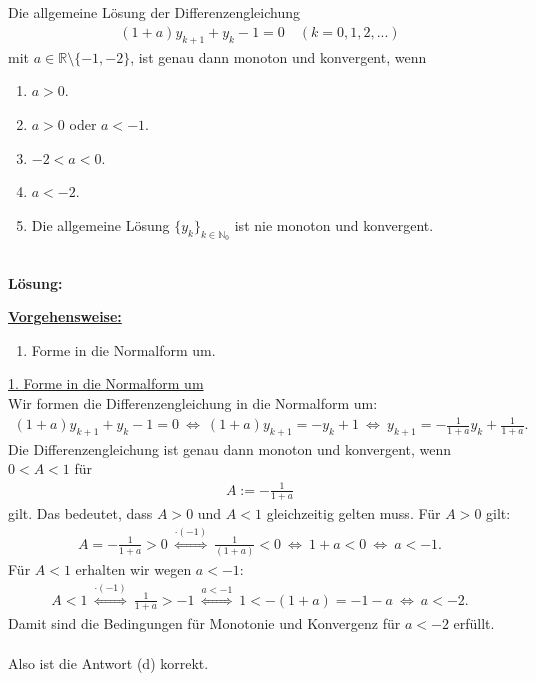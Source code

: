 \subsection*{}
Die allgemeine Lösung der  Differenzengleichung
\begin{align*}
	(1+a) y_{k+1} + y_k -1 = 0
	\quad (k = 0,1,2,...)
\end{align*}
mit $ a \in \mathbb{R} \setminus \{-1,-2\} $, ist genau dann monoton und konvergent, wenn
\renewcommand{\labelenumi}{(\alph{enumi})}
\begin{enumerate}
	\item
	$ a > 0 $.
	\item
	$ a >0 $ oder $ a < -1 $.	
	\item 
	$ -2 < a < 0 $.
	\item
	$ a < -2 $.
	\item 
	Die allgemeine Lösung $ \{y_k\}_{k \in \mathbb{N}_0} $ ist nie monoton und konvergent.
\end{enumerate}
\ \\
\textbf{Lösung:}
\begin{mdframed}
\underline{\textbf{Vorgehensweise:}}
\renewcommand{\labelenumi}{\theenumi.}
\begin{enumerate}
\item Forme in die Normalform um.
\end{enumerate}
\end{mdframed}

\underline{1. Forme in die Normalform um}\\
Wir formen die Differenzengleichung in die Normalform um:
\begin{align*}
	(1+a) y_{k+1} + y_k -1 = 0
	\ \Leftrightarrow \
	(1+a) y_{k+1} =  -y_k + 1
	\ \Leftrightarrow \
	y_{k+1} = -\frac{1}{1+a} y_k + \frac{1}{1+a}.
\end{align*}
Die Differenzengleichung ist genau dann monoton und konvergent, wenn $ 0 < A < 1 $ für
\begin{align*}
	A := -\frac{1}{1+a}
\end{align*}
gilt. 
Das bedeutet, dass $ A> 0  $ und $ A < 1 $ gleichzeitig gelten muss.
Für $ A > 0 $ gilt:
\begin{align*}
	A  = - \frac{1}{1+a} > 0
	\ \overset{\cdot (-1)}{\Leftrightarrow} \
	\frac{1}{(1+a)} < 0
	\ \Leftrightarrow \
	1+a < 0 
	\ \Leftrightarrow \
	a < -1. 
\end{align*}
Für $ A < 1 $ erhalten wir wegen $ a < -1 $:
\begin{align*}
	A < 1 
	\ \overset{\cdot (-1)}{\Leftrightarrow} \
	\frac{1}{1+a} > -1
	\ \overset{a < -1}{\Leftrightarrow} \
	1 < -(1+a) = -1 -a
	\ \Leftrightarrow \
	a < -2.
\end{align*}
Damit sind die Bedingungen für Monotonie und Konvergenz für $ a < -2 $ erfüllt.\\
\\
Also ist die Antwort (d) korrekt.